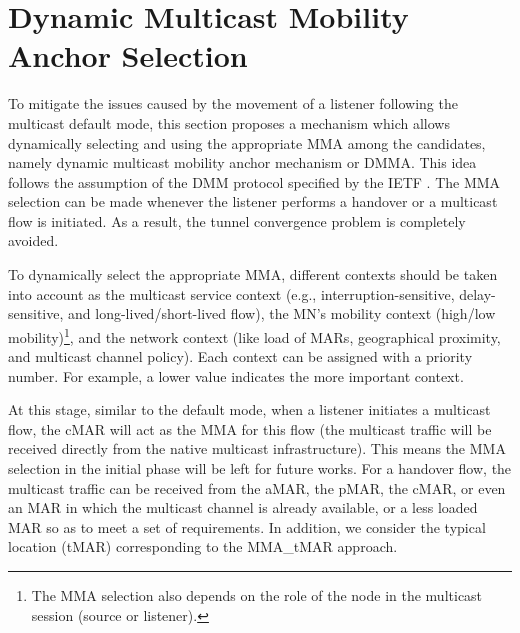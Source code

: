 \section{Dynamic Multicast Mobility Anchor Selection} \label{c10:dmma}
To mitigate the issues caused by the movement of a listener following the multicast default mode, this section proposes a mechanism which allows dynamically selecting and using the appropriate MMA among the candidates, namely dynamic multicast mobility anchor mechanism or DMMA. This idea follows the assumption of the DMM protocol specified by the IETF \cite{dmm-best-practice}. The MMA selection can be made whenever the listener performs a handover or a multicast flow is initiated. As a result, the tunnel convergence problem is completely avoided. 

To dynamically select the appropriate MMA, different contexts should be taken into account as the multicast service context (e.g., interruption-sensitive, delay-sensitive, and long-lived/short-lived flow), the MN's mobility context (high/low mobility)\footnote{The MMA selection also depends on the role of the node in the multicast session (source or listener).}, and the network context (like load of MARs, geographical proximity, and multicast channel policy). Each context can be assigned with a priority number. For example, a lower value indicates the more important context. 

At this stage, similar to the default mode, when a listener initiates a multicast flow, the cMAR will act as the MMA for this flow (the multicast traffic will be received directly from the native multicast infrastructure). This means the MMA selection in the initial phase will be left for future works. For a handover flow, the multicast traffic can be received from the aMAR, the pMAR, the cMAR, or even an MAR in which the multicast channel is already available, or a less loaded MAR so as to meet a set of requirements. In addition, we consider the typical location (tMAR) corresponding to the MMA\_tMAR approach. 


